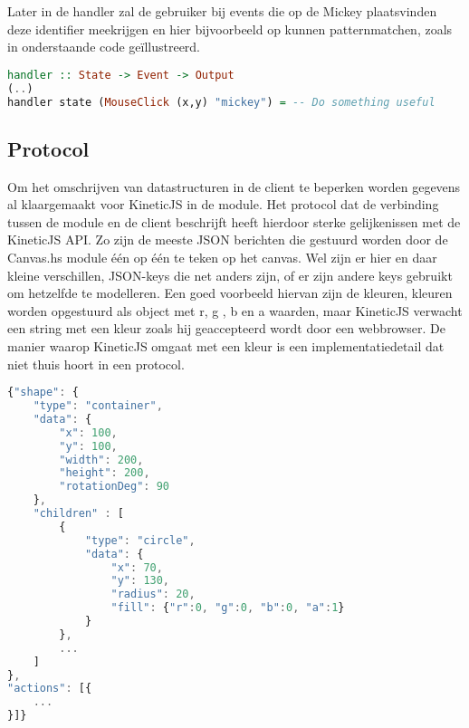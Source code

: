 Later in de handler zal de gebruiker bij events die op de Mickey plaatsvinden deze identifier meekrijgen en hier bijvoorbeeld op kunnen patternmatchen, zoals in onderstaande code geïllustreerd.

\begin{lstlisting}[style=densecode, language=Haskell]
handler :: State -> Event -> Output
(..)
handler state (MouseClick (x,y) "mickey") = -- Do something useful
\end{lstlisting}


\subsection{Protocol}
Om het omschrijven van datastructuren in de client te beperken worden gegevens al klaargemaakt voor KineticJS in de module. Het protocol dat de verbinding tussen de module en de client beschrijft heeft hierdoor sterke gelijkenissen met de KineticJS API. Zo zijn de meeste JSON berichten die gestuurd worden door de Canvas.hs module één op één te teken op het canvas. Wel zijn er hier en daar kleine verschillen, JSON-keys die net anders zijn, of er zijn andere keys gebruikt om hetzelfde te modelleren. Een goed voorbeeld hiervan zijn de kleuren, kleuren worden opgestuurd als object met r, g , b en a waarden, maar KineticJS verwacht een string met een kleur zoals hij geaccepteerd wordt door een webbrowser. De manier waarop KineticJS omgaat met een kleur is een implementatiedetail dat niet thuis hoort in een protocol.

\begin{lstlisting}[style=densecode, language=JavaScript]
{"shape": {
    "type": "container",
    "data": {
        "x": 100,
        "y": 100,
        "width": 200,
        "height": 200,
        "rotationDeg": 90
    },
    "children" : [
        {
            "type": "circle",
            "data": {
                "x": 70,
                "y": 130,
                "radius": 20,
                "fill": {"r":0, "g":0, "b":0, "a":1}
            }
        },
        ...
    ]
},
"actions": [{
    ...
}]}
\end{lstlisting}
